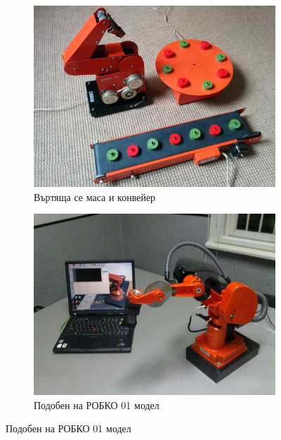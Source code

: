 \begin{figure}
    \centering
    \begin{subfigure}{0.45\textwidth}
        \centering
        \includegraphics[width=\linewidth]{pictures/turntable_conveyor.jpg}
        \caption{Въртяща се маса и конвейер}
        \label{fig:turntable}
    \end{subfigure}
    \hfill%
    \begin{subfigure}{0.45\textwidth}
        \centering
        \includegraphics[width=\linewidth]{pictures/robko_alt.jpg}
        \caption{Подобен на РОБКО 01 модел}
        \label{fig:robko_alt}
    \end{subfigure}
    \par\bigskip

\end{figure}
